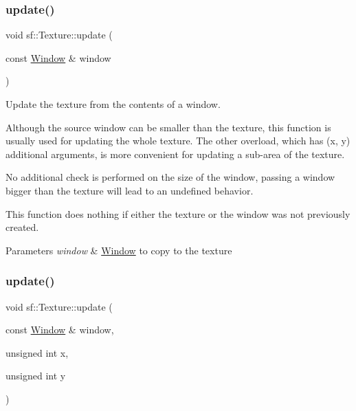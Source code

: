 \subsubsection{\texorpdfstring{update()}{update()}\hspace{0.1cm}{\footnotesize\ttfamily [5/6]}}
{\footnotesize\ttfamily void sf\+::\+Texture\+::update (\begin{DoxyParamCaption}\item[{const \hyperlink{classsf_1_1_window}{Window} \&}]{window }\end{DoxyParamCaption})}



Update the texture from the contents of a window. 

Although the source window can be smaller than the texture, this function is usually used for updating the whole texture. The other overload, which has (x, y) additional arguments, is more convenient for updating a sub-\/area of the texture.

No additional check is performed on the size of the window, passing a window bigger than the texture will lead to an undefined behavior.

This function does nothing if either the texture or the window was not previously created.


\begin{DoxyParams}{Parameters}
{\em window} & \hyperlink{classsf_1_1_window}{Window} to copy to the texture \\
\hline
\end{DoxyParams}
\mbox{\label{classsf_1_1_texture_a154f246eb8059b602076009ab1cfd175}} 
\subsubsection{\texorpdfstring{update()}{update()}\hspace{0.1cm}{\footnotesize\ttfamily [6/6]}}
{\footnotesize\ttfamily void sf\+::\+Texture\+::update (\begin{DoxyParamCaption}\item[{const \hyperlink{classsf_1_1_window}{Window} \&}]{window,  }\item[{unsigned int}]{x,  }\item[{unsigned int}]{y }\end{DoxyParamCaption})}



